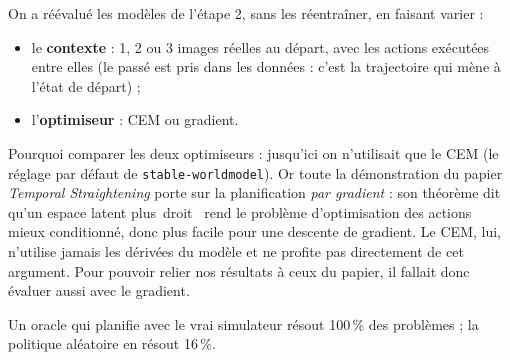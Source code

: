 \documentclass[11pt,a4paper]{article}
\newcommand{\og}{\guillemotleft\,\ignorespaces}
\newcommand{\fg}{\unskip\,\guillemotright}
\begin{document}
On a réévalué les modèles de l'étape 2, sans les réentraîner, en faisant varier :
\begin{itemize}
  \item le \textbf{contexte} : 1, 2 ou 3 images réelles au départ, avec les actions exécutées
  entre elles (le passé est pris dans les données : c'est la trajectoire qui mène à l'état de
  départ) ;
  \item l'\textbf{optimiseur} : CEM ou gradient.
\end{itemize}
Pourquoi comparer les deux optimiseurs : jusqu'ici on n'utilisait que le CEM (le réglage par
défaut de \texttt{stable-worldmodel}). Or toute la démonstration du papier \emph{Temporal
Straightening} porte sur la planification \emph{par gradient} : son théorème dit qu'un espace
latent plus \og droit \fg{} rend le problème d'optimisation des actions mieux conditionné, donc
plus facile pour une descente de gradient. Le CEM, lui, n'utilise jamais les dérivées du modèle
et ne profite pas directement de cet argument. Pour pouvoir relier nos résultats à ceux du
papier, il fallait donc évaluer aussi avec le gradient.

Un oracle qui planifie avec le vrai simulateur résout 100\,\% des problèmes ; la politique
aléatoire en résout 16\,\%.
\end{document}
